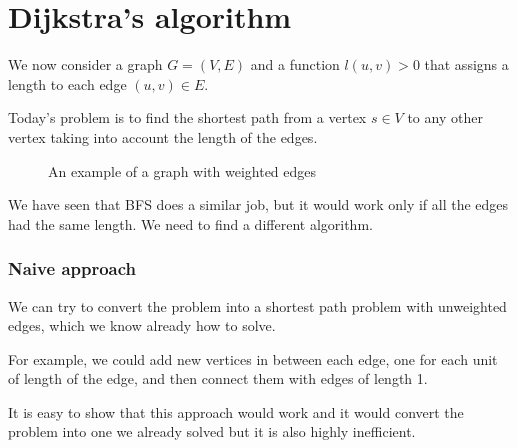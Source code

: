 \documentclass[12pt]{extarticle}
\begin{document}
\section{Dijkstra's algorithm}

We now consider a graph $G = (V, E)$ and a function $l(u, v) > 0$ that assigns a length to each edge $(u, v) \in E$.

Today's problem is to find the shortest path from a vertex $s \in V$ to any other vertex taking into account the length of the edges.

\begin{figure}[H]
    \centering

    \caption{An example of a graph with weighted edges} \label{fig:weightedgraph}
\end{figure}

We have seen that BFS does a similar job, but it would work only if all the edges had the same length. We need to find a different algorithm.

\subsubsection{Naive approach}

We can try to convert the problem into a shortest path problem with unweighted edges, which we know already how to solve.

For example, we could add new vertices in between each edge, one for each unit of length of the edge, and then connect them with edges of length 1.

It is easy to show that this approach would work and it would convert the problem into one we already solved but it is also highly inefficient.
\end{document}
